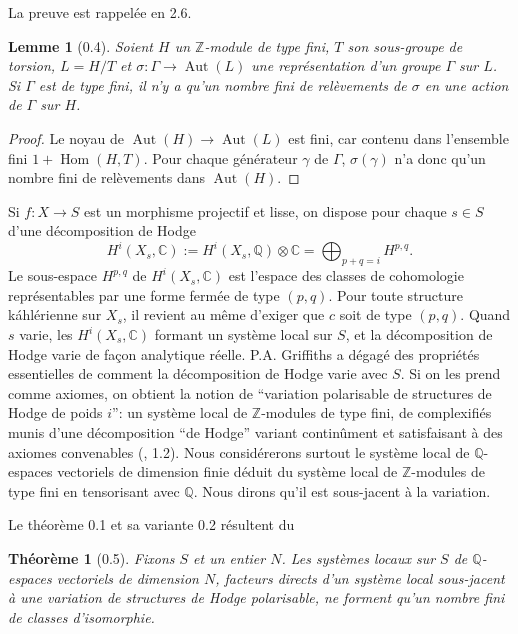 \documentclass[12pt,a4paper]{article}
\theoremstyle{plain}
\newtheorem{theorem}{Th\'{e}or\`{e}me}[section]
\newtheorem{lemma}{Lemme}[section]
\theoremstyle{definition}
\DeclareMathOperator{\Hom}{Hom}
\DeclareMathOperator{\Aut}{Aut}
\newcommand{\CC}{\mathbb{C}}
\newcommand{\QQ}{\mathbb{Q}}
\newcommand{\ZZ}{\mathbb{Z}}
\begin{document}
La preuve est rappel\'{e}e en 2.6.

\begin{lemma}[0.4]
Soient $H$ un $\ZZ$-module de type fini, $T$ son sous-groupe de torsion, $L = H/T$ et $\sigma : \Gamma \to \Aut(L)$ une repr\'{e}sentation d'un groupe $\Gamma$ sur $L$. Si $\Gamma$ est de type fini, il n'y a qu'un nombre fini de rel\`{e}vements de $\sigma$ en une action de $\Gamma$ sur $H$.
\end{lemma}

\begin{proof}
Le noyau de $\Aut(H) \to \Aut(L)$ est fini, car contenu dans l'ensemble fini $1 + \Hom(H, T)$. Pour chaque g\'{e}n\'{e}rateur $\gamma$ de $\Gamma$, $\sigma(\gamma)$ n'a donc qu'un nombre fini de rel\`{e}vements dans $\Aut(H)$.
\end{proof}

Si $f : X \to S$ est un morphisme projectif et lisse, on dispose pour chaque $s \in S$ d'une d\'{e}composition de Hodge
\[
H^{i}(X_{s}, \CC) := H^{i}(X_{s}, \QQ) \otimes \CC = \bigoplus_{p+q=i} H^{p,q}.
\]
Le sous-espace $H^{p,q}$ de $H^{i}(X_{s}, \CC)$ est l'espace des classes de cohomologie repr\'{e}sentables par une forme ferm\'{e}e de type $(p,q)$. Pour toute structure k\'{a}hl\'{e}rienne sur $X_{s}$, il revient au m\^{e}me d'exiger que $c$ soit de type $(p,q)$. Quand $s$ varie, les $H^{i}(X_{s}, \CC)$ formant un syst\`{e}me local sur $S$, et la d\'{e}composition de Hodge varie de fa\c{c}on analytique r\'{e}elle. P.A. Griffiths a d\'{e}gag\'{e} des propri\'{e}t\'{e}s essentielles de comment la d\'{e}composition de Hodge varie avec $S$. Si on les prend comme axiomes, on obtient la notion de ``variation polarisable de structures de Hodge de poids $i$'': un syst\`{e}me local de $\ZZ$-modules de type fini, de complexifi\'{e}s munis d'une d\'{e}composition ``de Hodge'' variant contin\^{u}ment et satisfaisant \`{a} des axiomes convenables (\cite{GriffithsIII}, 1.2). Nous consid\'{e}rerons surtout le syst\`{e}me local de $\QQ$-espaces vectoriels de dimension finie d\'{e}duit du syst\`{e}me local de $\ZZ$-modules de type fini en tensorisant avec $\QQ$. Nous dirons qu'il est sous-jacent \`{a} la variation.

Le th\'{e}or\`{e}me 0.1 et sa variante 0.2 r\'{e}sultent du

\begin{theorem}[0.5]
Fixons $S$ et un entier $N$. Les syst\`{e}mes locaux sur $S$ de $\QQ$-espaces vectoriels de dimension $N$, facteurs directs d'un syst\`{e}me local sous-jacent \`{a} une variation de structures de Hodge polarisable, ne forment qu'un nombre fini de classes d'isomorphie.
\end{theorem}
\end{document}
